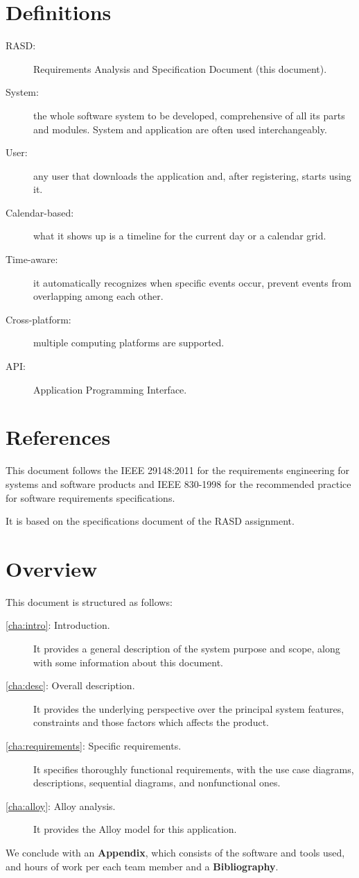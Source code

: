 \section{Definitions}
\label{sec:defs}
\begin{description}
\item[RASD:] Requirements Analysis and Specification Document (this document).
\item[System:] the whole software system to be developed, comprehensive of all its parts and modules. System and application are often used interchangeably. 
\item[User:] any user that downloads the application and, after registering, starts using it.
\item[Calendar-based:] what it shows up is a timeline for the current day or a calendar grid. 
\item[Time-aware:] it automatically recognizes when specific events occur, prevent events from overlapping among each other.
\item[Cross-platform:] multiple computing platforms are supported.
\item[API:] Application Programming Interface.
\end{description}

\section{References}
\label{sec:refer}

This document follows the IEEE 29148:2011\cite{ieee-29148} for the requirements engineering for systems and software products and IEEE 830-1998\cite{ieee-830} for the recommended practice for software requirements specifications.

It is based on the specifications document of the RASD assignment\cite{assignment}.

\section{Overview}
\label{sec:overview}

This document is structured as follows:
\begin{description}
\item[\autoref{cha:intro}: Introduction.] It provides a general description of the system purpose and scope, along with some information about this document.
\item[\autoref{cha:desc}: Overall description.] It provides the underlying perspective over the principal system features, constraints and those factors which affects the product.
\item[\autoref{cha:requirements}: Specific requirements.] It specifies thoroughly functional requirements, with the use case diagrams, descriptions, sequential diagrams, and nonfunctional ones.
\item[\autoref{cha:alloy}: Alloy analysis.] It provides the Alloy model for this application.
\end{description}
We conclude with an \textbf{Appendix}, which consists of the software and tools used, and hours of work per each team member and a \textbf{Bibliography}.
